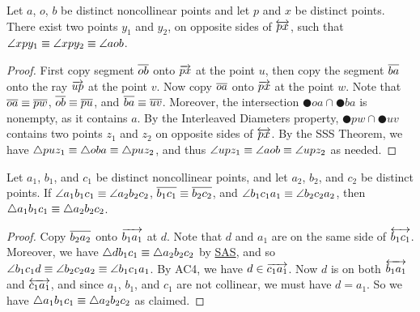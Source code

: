 \begin{construct}
Let \(a\), \(o\), \(b\) be distinct noncollinear points and let \(p\) and \(x\) be distinct points.
There exist two points \(y_1\) and \(y_2\), on opposite sides of \(\overleftrightarrow{px}\), such that \(\angle{xpy_1} \equiv \angle{xpy_2} \equiv \angle{aob}\). 
\end{construct}

\begin{proof}
First copy segment \(\overline{ob}\) onto \(\overrightarrow{px}\) at the point \(u\), then copy the segment \(\overline{ba}\) onto the ray \(\overrightarrow{up}\) at the point \(v\).
Now copy \(\overline{oa}\) onto \(\overrightarrow{px}\) at the point \(w\).
Note that \(\overline{oa} \equiv \overline{pw}\), \(\overline{ob} \equiv \overline{pu}\), and \(\overline{ba} \equiv \overline{uv}\).
Moreover, the intersection \(\CIRCLE{o}{a} \cap \CIRCLE{b}{a}\) is nonempty, as it contains \(a\).
By the Interleaved Diameters property, \(\CIRCLE{p}{w} \cap \CIRCLE{u}{v}\) contains two points \(z_1\) and \(z_2\) on opposite sides of \(\overleftrightarrow{px}\).
By the SSS Theorem, we have \(\bigtriangleup{puz_1} \equiv \bigtriangleup{oba} \equiv \bigtriangleup{puz_2}\), and thus \(\angle{upz_1} \equiv \angle{aob} \equiv \angle{upz_2}\) as needed.
\end{proof}

\begin{prop}
Let \(a_1\), \(b_1\), and \(c_1\) be distinct noncollinear points, and let \(a_2\), \(b_2\), and \(c_2\) be distinct points.
If \(\angle{a_1b_1c_1} \equiv \angle{a_2b_2c_2}\), \(\overline{b_1c_1} \equiv \overline{b_2c_2}\), and \(\angle{b_1c_1a_1} \equiv \angle{b_2c_2a_2}\), then \(\bigtriangleup{a_1b_1c_1} \equiv \bigtriangleup{a_2b_2c_2}\).
\end{prop}

\begin{proof}
Copy \(\overline{b_2a_2}\) onto \(\overrightarrow{b_1a_1}\) at \(d\).
Note that \(d\) and \(a_1\) are on the same side of \(\overleftrightarrow{b_1c_1}\).
Moreover, we have \(\bigtriangleup{db_1c_1} \equiv \bigtriangleup{a_2b_2c_2}\) by \hyperref[prop:sas-theorem]{SAS}, and so \(\angle{b_1c_1d} \equiv \angle{b_2c_2a_2} \equiv \angle{b_1c_1a_1}\).
By AC4, we have \(d \in \overrightarrow{c_1a_1}\).
Now \(d\) is on both \(\overleftrightarrow{b_1a_1}\) and \(\overleftrightarrow{c_1a_1}\), and since \(a_1\), \(b_1\), and \(c_1\) are not collinear, we must have \(d = a_1\).
So we have \(\bigtriangleup{a_1b_1c_1} \equiv \bigtriangleup{a_2b_2c_2}\) as claimed.
\end{proof}


